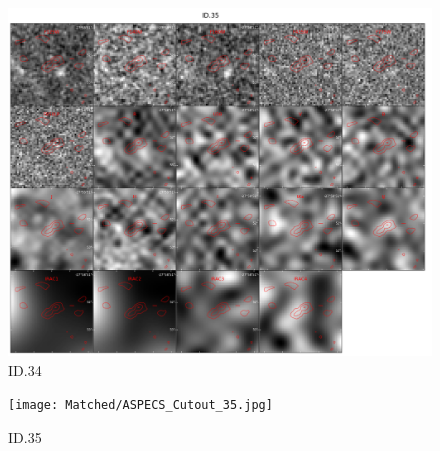 \begin{figure}[tbp]
\centering \includegraphics[width=120mm]{Matched/ASPECS_Cutout_34.jpg}
\caption{ID.34}
\label{fig:Match_Three}
\end{figure}

\begin{figure}[tbp]
\centering \texttt{[image: Matched/ASPECS\_Cutout\_35.jpg]}
\caption{ID.35}
\label{fig:Match_Three}
\end{figure}
